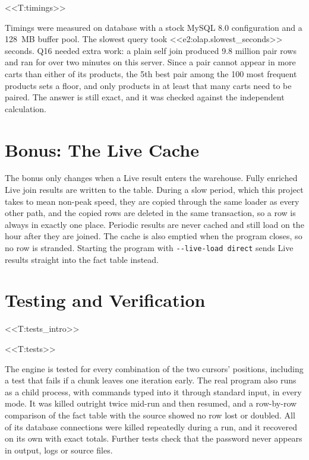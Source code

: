 \documentclass[11pt,a4paper]{article}
\newcommand{\code}[1]{\texttt{\detokenize{#1}}}
\begin{document}
<<T:timings>>

Timings were measured on database \code{<<e2:olap.database>>} with a stock MySQL 8.0 configuration and a 128~MB buffer pool. The slowest query took <<e2:olap.slowest_seconds>> seconds. Q16 needed extra work: a plain self join produced 9.8 million pair rows and ran for over two minutes on this server. Since a pair cannot appear in more carts than either of its products, the 5th best pair among the 100 most frequent products sets a floor, and only products in at least that many carts need to be paired. The answer is still exact, and it was checked against the independent calculation.

\section{Bonus: The Live Cache}

The bonus only changes when a Live result enters the warehouse. Fully enriched Live join results are written to the \code{live_cache} table. During a slow period, which this project takes to mean non-peak speed, they are copied through the same loader as every other path, and the copied rows are deleted in the same transaction, so a row is always in exactly one place. Periodic results are never cached and still load on the hour after they are joined. The cache is also emptied when the program closes, so no row is stranded. Starting the program with \texttt{-{}-live-load direct} sends Live results straight into the fact table instead.

\section{Testing and Verification}

<<T:tests_intro>>

<<T:tests>>

The engine is tested for every combination of the two cursors' positions, including a test that fails if a chunk leaves one iteration early. The real program also runs as a child process, with commands typed into it through standard input, in every mode. It was killed outright twice mid-run and then resumed, and a row-by-row comparison of the fact table with the source showed no row lost or doubled. All of its database connections were killed repeatedly during a run, and it recovered on its own with exact totals. Further tests check that the password never appears in output, logs or source files.
\end{document}
